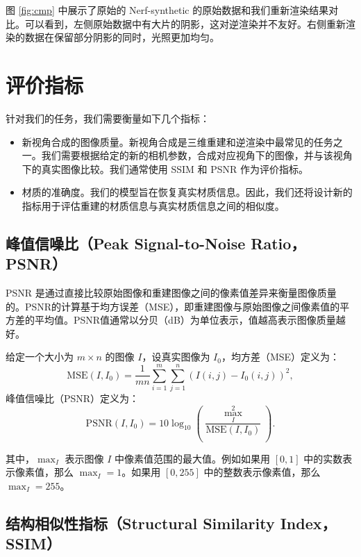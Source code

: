 图 \ref{fig:cmp} 中展示了原始的 Nerf-synthetic 的原始数据和我们重新渲染结果对比。可以看到，左侧原始数据中有大片的阴影，这对逆渲染并不友好。右侧重新渲染的数据在保留部分阴影的同时，光照更加均匀。

\section{评价指标}

针对我们的任务，我们需要衡量如下几个指标：

\begin{itemize}
  \item 新视角合成的图像质量。新视角合成是三维重建和逆渲染中最常见的任务之一。我们需要根据给定的新的相机参数，合成对应视角下的图像，并与该视角下的真实图像比较。我们通常使用 SSIM 和 PSNR 作为评价指标。
  \item 材质的准确度。我们的模型旨在恢复真实材质信息。因此，我们还将设计新的指标用于评估重建的材质信息与真实材质信息之间的相似度。
\end{itemize}

\subsection{峰值信噪比（Peak Signal-to-Noise Ratio，PSNR）}

PSNR 是通过直接比较原始图像和重建图像之间的像素值差异来衡量图像质量的。PSNR的计算基于均方误差（MSE），即重建图像与原始图像之间像素值的平方差的平均值。PSNR值通常以分贝（dB）为单位表示，值越高表示图像质量越好。

给定一个大小为 $m \times n$ 的图像 $I$，设真实图像为 $I_0$，均方差（MSE）定义为：
\begin{equation}
  \text{MSE}(I, I_0) = \frac{1}{mn} \sum_{i=1}^m \sum_{j=1}^n (I(i, j) - I_0(i, j))^2,
\end{equation}
峰值信噪比（PSNR）定义为：
\begin{equation}
  \text{PSNR}(I, I_0) = 10 \log_{10} \left( \frac{\max^2_I}{\text{MSE}(I, I_0)} \right).
\end{equation}

其中，$\max_I$ 表示图像 $I$ 中像素值范围的最大值。例如如果用 $[0,1]$ 中的实数表示像素值，那么 $\max_I = 1$。如果用 $[0,255]$ 中的整数表示像素值，那么 $\max_I = 255$。

\subsection{结构相似性指标（Structural Similarity Index，SSIM）}

